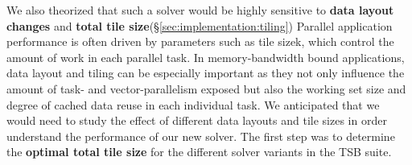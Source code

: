 \documentclass{sig-alternate-05-2015}
\begin{document}
We also theorized that such a solver would be highly sensitive to
  \textbf{data layout changes} and
  \textbf{total tile size}(\S\ref{sec:implementation:tiling})
Parallel application performance is often driven by parameters such as 
  tile sizek, which control the amount of work in each parallel task.
In memory-bandwidth bound applications, data layout and tiling can be
  especially important as they not only influence the amount of task- and
  vector-parallelism exposed but also the working set size and degree of cached
  data reuse in each individual task.
We anticipated that we would need to study the effect of different data layouts
  and tile sizes in order understand the performance of our new solver.
The first step was to determine the \textbf{optimal total tile size} for the 
  different solver variants in the TSB suite.


\end{document}
